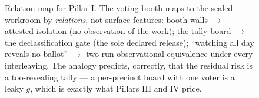 \begin{figure}[htbp]
{\begin{tikzpicture}[x=1cm,y=1cm]
\end{tikzpicture}%
}
\caption{Relation-map for Pillar I. The voting booth maps to the sealed workroom by
\emph{relations}, not surface features: booth walls $\to$ attested isolation (no observation of the work); the tally board $\to$
the declassification gate (the sole declared release); ``watching all day reveals no ballot'' $\to$ two-run observational
equivalence under every interleaving. The analogy predicts, correctly, that the residual risk is a too-revealing tally --- a
per-precinct board with one voter is a leaky $g$, which is exactly what Pillars III and IV price.}
\label{fig:r9rel}
\end{figure}
